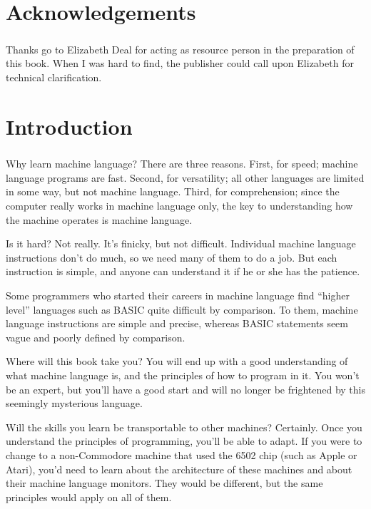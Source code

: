 \documentclass[11pt,a4paper,titlepage]{memoir}
\begin{document}
\chapter{Acknowledgements}
\paragraph{}
Thanks go to Elizabeth Deal for acting as resource person in the preparation of this book. When I was hard to find, the publisher could call upon Elizabeth for technical clarification.
\chapter{Introduction}
\paragraph{}
Why learn machine language? There are three reasons. First, for speed; machine language programs are fast. Second, for versatility; all other languages are limited in some way, but not machine language. Third, for comprehension; since the computer really works in machine language only, the key to understanding how the machine operates is machine language.

Is it hard? Not really. It's finicky, but not difficult. Individual machine language instructions don't do much, so we need many of them to do a job. But each instruction is simple, and anyone can understand it if he or she has the patience.

Some programmers who started their careers in machine language find ``higher level'' languages such as BASIC quite difficult by comparison. To them, machine language instructions are simple and precise, whereas BASIC statements seem vague and poorly defined by comparison.

Where will this book take you? You will end up with a good understanding of what machine language is, and the principles of how to program in it. You won't be an expert, but you'll have a good start and will no longer be frightened by this seemingly mysterious language.

Will the skills you learn be transportable to other machines? Certainly. Once you understand the principles of programming, you'll be able to adapt. If you were to change to a non-Commodore machine that used the 6502 chip (such as Apple or Atari), you'd need to learn about the architecture of these machines and about their machine language monitors. They would be different, but the same principles would apply on all of them.
\end{document}
